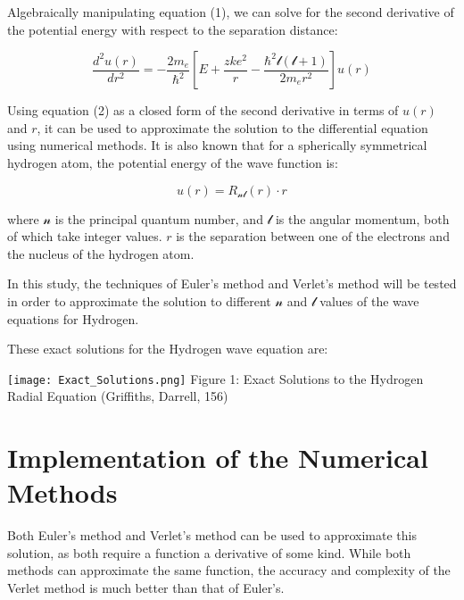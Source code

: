 \documentclass{article}
\begin{document}
\begin{multicols}{2}
Algebraically manipulating equation (1), we can solve for the second derivative of the potential energy with respect to the separation distance:

\begin{equation}
\label{equation2}
\frac{d^2u(r)}{dr^2} = -\frac{2m_e}{{\hbar}^2}\left[E + \frac{zke^2}{r} - \frac{{\hbar}^2\mathcal{l}\left(\mathcal{l}+1\right)}{2m_er^2}\right]u(r)
\end{equation}

\vspace{0.1in}

Using equation (2) as a closed form of the second derivative in terms of $u(r)$ and $r$, it can be used to approximate the solution to the differential equation using numerical methods. It is also known that for a spherically symmetrical hydrogen atom, the potential energy of the wave function is:

\begin{equation}
\label{equation3}
u(r) = R_{\mathcal{n}\mathcal{l}}(r) \cdot r
\end{equation}

\vspace{0.1in}

where $\mathcal{n}$ is the principal quantum number, and $\mathcal{l}$ is the angular momentum, both of which take integer values. $r$ is the separation between one of the electrons and the nucleus of the hydrogen atom.

In this study, the techniques of Euler's method and Verlet's method will be tested in order to approximate the solution to different $\mathcal{n}$ and $\mathcal{l}$ values of the wave equations for Hydrogen.

These exact solutions for the Hydrogen wave equation are:

\begin{center}
\texttt{[image: Exact\_Solutions.png]}
\scriptsize{
Figure 1: Exact Solutions to the Hydrogen Radial Equation (Griffiths, Darrell, 156)
}
\end{center}

\section{Implementation of the Numerical Methods}
Both Euler's method and Verlet's method can be used to approximate this solution, as both require a function a derivative of some kind. While both methods can approximate the same function, the accuracy and complexity of the Verlet method is much better than that of Euler's.


\end{multicols}
\end{document}
